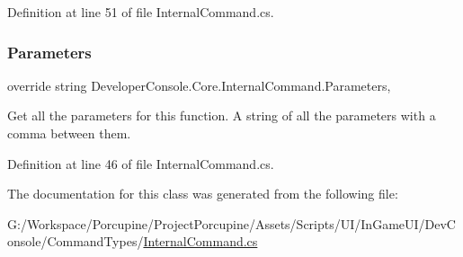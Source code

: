 Definition at line 51 of file Internal\+Command.\+cs.

\mbox{\label{class_developer_console_1_1_core_1_1_internal_command_a3ff56e669bfd4c06244116cbbcc35818}} 
\subsubsection{\texorpdfstring{Parameters}{Parameters}}
{\footnotesize\ttfamily override string Developer\+Console.\+Core.\+Internal\+Command.\+Parameters\hspace{0.3cm}{\ttfamily [get]}, {}}



Get all the parameters for this function. A string of all the parameters with a comma between them. 



Definition at line 46 of file Internal\+Command.\+cs.



The documentation for this class was generated from the following file\+:\begin{DoxyCompactItemize}
\item 
G\+:/\+Workspace/\+Porcupine/\+Project\+Porcupine/\+Assets/\+Scripts/\+U\+I/\+In\+Game\+U\+I/\+Dev\+Console/\+Command\+Types/\hyperlink{_internal_command_8cs}{Internal\+Command.\+cs}\end{DoxyCompactItemize}
